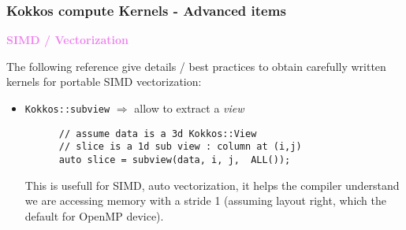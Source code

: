 \begin{frame}[fragile=singleslide]
  \frametitle{Kokkos compute Kernels - Advanced items}

  {\Large \textcolor{violet}{\textbf{SIMD / Vectorization}}}

  The following reference give details / best practices to obtain carefully written kernels for portable SIMD vectorization:\\

  \begin{itemize}
  \item \texttt{Kokkos::subview} $\Rightarrow$ allow to extract a {\it view}
    \begin{verbatim}
      // assume data is a 3d Kokkos::View
      // slice is a 1d sub view : column at (i,j)
      auto slice = subview(data, i, j,  ALL());
    \end{verbatim}
    This is usefull for SIMD, auto vectorization, it helps the compiler understand we are accessing
    memory with a stride 1 (assuming layout right, which the default for OpenMP device).
  \end{itemize}


\end{frame}
